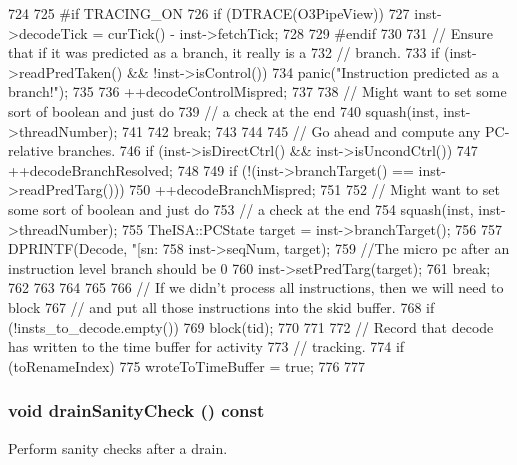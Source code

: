 \begin{DoxyCode}
{{724 
725 #if TRACING_ON
726         if (DTRACE(O3PipeView)) {
727             inst->decodeTick = curTick() - inst->fetchTick;
728         }
729 #endif
730 
731         // Ensure that if it was predicted as a branch, it really is a
732         // branch.
733         if (inst->readPredTaken() && !inst->isControl()) {
734             panic("Instruction predicted as a branch!");
735 
736             ++decodeControlMispred;
737 
738             // Might want to set some sort of boolean and just do
739             // a check at the end
740             squash(inst, inst->threadNumber);
741 
742             break;
743         }
744 
745         // Go ahead and compute any PC-relative branches.
746         if (inst->isDirectCtrl() && inst->isUncondCtrl()) {
747             ++decodeBranchResolved;
748 
749             if (!(inst->branchTarget() == inst->readPredTarg())) {
750                 ++decodeBranchMispred;
751 
752                 // Might want to set some sort of boolean and just do
753                 // a check at the end
754                 squash(inst, inst->threadNumber);
755                 TheISA::PCState target = inst->branchTarget();
756 
757                 DPRINTF(Decode, "[sn:%
758                         inst->seqNum, target);
759                 //The micro pc after an instruction level branch should be 0
760                 inst->setPredTarg(target);
761                 break;
762             }
763         }
764     }
765 
766     // If we didn't process all instructions, then we will need to block
767     // and put all those instructions into the skid buffer.
768     if (!insts_to_decode.empty()) {
769         block(tid);
770     }
771 
772     // Record that decode has written to the time buffer for activity
773     // tracking.
774     if (toRenameIndex) {
775         wroteToTimeBuffer = true;
776     }
777 }
\end{DoxyCode}
\hypertarget{classDefaultDecode_a0240eb42fa57fe5d3788093f62b77347}{
\subsubsection[{drainSanityCheck}]{\setlength{\rightskip}{0pt plus 5cm}void drainSanityCheck () const}}
\label{classDefaultDecode_a0240eb42fa57fe5d3788093f62b77347}
Perform sanity checks after a drain. 


